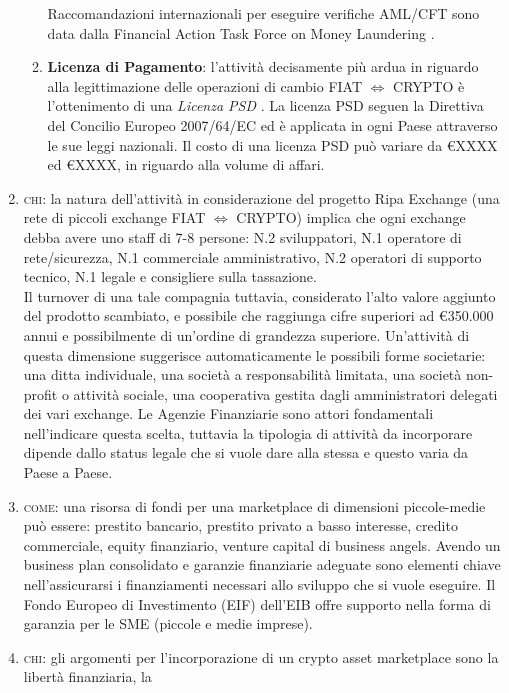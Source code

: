 \documentclass[11pt,fleqn,oneside]{book} %
\begin{document}
\begin{enumerate}
\begin{enumerate}[label*=\arabic*.]
			Raccomandazioni internazionali per eseguire verifiche AML/CFT sono data dalla Financial Action Task Force on Money Laundering \cite{FATF}.
			\item \textbf{Licenza di Pagamento}: l'attività decisamente più ardua in riguardo alla legittimazione delle operazioni di cambio FIAT $\Leftrightarrow$ CRYPTO
			è l'ottenimento di una \textit{Licenza PSD} \cite{PSD}.
			La licenza PSD seguen la Direttiva del Concilio Europeo 2007/64/EC ed è applicata in ogni Paese attraverso le sue leggi nazionali.
			Il costo di una licenza PSD può variare da \euro XXXX ed \euro XXXX, in riguardo alla volume di affari.
		\end{enumerate}
	\item \textsc{chi}: la natura dell'attività in considerazione del progetto Ripa Exchange (una rete di piccoli exchange FIAT $\Leftrightarrow$ CRYPTO)
	implica che ogni exchange debba avere uno staff di 7-8 persone: N.2 sviluppatori, N.1 operatore di rete/sicurezza, 
	N.1 commerciale amministrativo, N.2 operatori di supporto tecnico, N.1 legale e consigliere sulla tassazione. \\
	Il turnover di una tale compagnia tuttavia, considerato l'alto valore aggiunto del prodotto scambiato, e possibile che raggiunga cifre
	superiori ad \euro 350.000 annui e possibilmente di un'ordine di grandezza superiore. Un'attività di questa dimensione
	suggerisce automaticamente le possibili forme societarie: una ditta individuale, una società a responsabilità limitata,
	una società non-profit o attività sociale, una cooperativa gestita dagli amministratori delegati dei vari exchange.
	Le Agenzie Finanziarie sono attori fondamentali nell'indicare questa scelta, tuttavia la tipologia di attività da
	incorporare dipende dallo status legale che si vuole dare alla stessa e questo varia da Paese a Paese.		
	\item \textsc{come}: una risorsa di fondi per una marketplace di dimensioni piccole-medie può essere: prestito bancario,
	prestito privato a basso interesse, credito commerciale, equity finanziario, venture capital di business angels. Avendo un
	business plan consolidato e garanzie finanziarie adeguate sono elementi chiave nell'assicurarsi i finanziamenti necessari
	allo sviluppo che si vuole eseguire. Il Fondo Europeo di Investimento (EIF) dell'EIB offre supporto nella forma di 
	garanzia per le SME (piccole e medie imprese).
	\item \textsc{chi}: gli argomenti per l'incorporazione di un crypto asset marketplace sono la libertà finanziaria, la

\end{enumerate}
\end{document}
